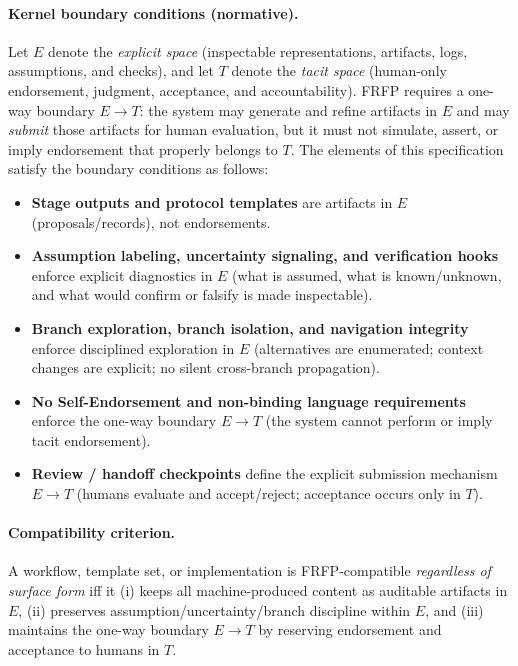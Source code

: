 \paragraph{Kernel boundary conditions (normative).}
Let $E$ denote the \emph{explicit space} (inspectable representations, artifacts, logs, assumptions, and checks),
and let $T$ denote the \emph{tacit space} (human-only endorsement, judgment, acceptance, and accountability).
FRFP requires a one-way boundary $E \rightarrow T$: the system may generate and refine artifacts in $E$ and may
\emph{submit} those artifacts for human evaluation, but it must not simulate, assert, or imply endorsement that
properly belongs to $T$.
The elements of this specification satisfy the boundary conditions as follows:
\begin{itemize}
  \item \textbf{Stage outputs and protocol templates} are artifacts in $E$ (proposals/records), not endorsements.
  \item \textbf{Assumption labeling, uncertainty signaling, and verification hooks} enforce explicit diagnostics in $E$
        (what is assumed, what is known/unknown, and what would confirm or falsify is made inspectable).
  \item \textbf{Branch exploration, branch isolation, and navigation integrity} enforce disciplined exploration in $E$
        (alternatives are enumerated; context changes are explicit; no silent cross-branch propagation).
  \item \textbf{No Self-Endorsement and non-binding language requirements} enforce the one-way boundary $E \rightarrow T$
        (the system cannot perform or imply tacit endorsement).
  \item \textbf{Review / handoff checkpoints} define the explicit submission mechanism $E \rightarrow T$
        (humans evaluate and accept/reject; acceptance occurs only in $T$).
\end{itemize}

\paragraph{Compatibility criterion.}
A workflow, template set, or implementation is FRFP-compatible \emph{regardless of surface form} iff it
(i) keeps all machine-produced content as auditable artifacts in $E$, (ii) preserves assumption/uncertainty/branch
discipline within $E$, and (iii) maintains the one-way boundary $E \rightarrow T$ by reserving endorsement and
acceptance to humans in $T$.

